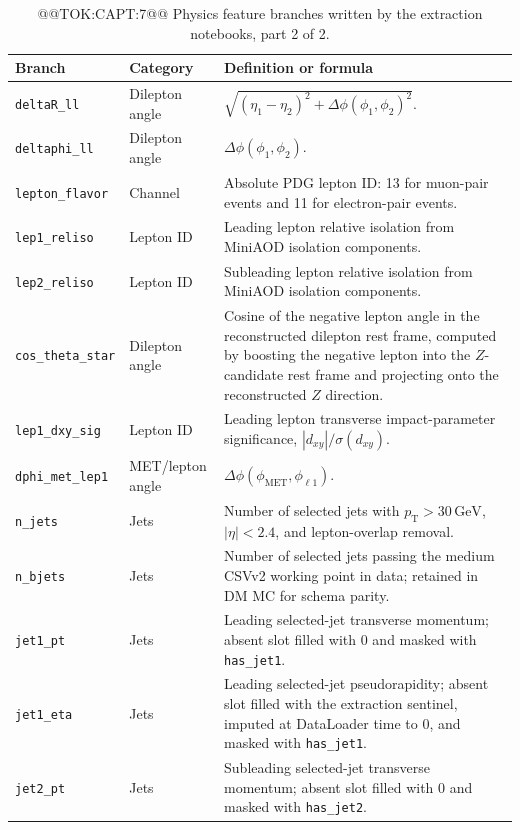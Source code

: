 \documentclass[11pt]{article}
\newcommand{\GeV}{\text{GeV}}
\begin{document}
\begin{table}[t]
\centering
\scriptsize
\caption{@@TOK:CAPT:7@@ Physics feature branches written by the extraction notebooks, part 2 of 2.}
\label{tab:appendix-features-cont}
\begin{tabular}{>{\raggedright\arraybackslash}p{}>{\raggedright\arraybackslash}p{}>{\raggedright\arraybackslash}p{}}
\toprule
Branch & Category & Definition or formula \\
\midrule
\texttt{deltaR\_ll} & Dilepton angle & \(\sqrt{(\eta_1-\eta_2)^2+\Delta\phi(\phi_1,\phi_2)^2}\). \\
\texttt{deltaphi\_ll} & Dilepton angle & \(\Delta\phi(\phi_1,\phi_2)\). \\
\texttt{lepton\_flavor} & Channel & Absolute PDG lepton ID: 13 for muon-pair events and 11 for electron-pair events. \\
\texttt{lep1\_reliso} & Lepton ID & Leading lepton relative isolation from MiniAOD isolation components. \\
\texttt{lep2\_reliso} & Lepton ID & Subleading lepton relative isolation from MiniAOD isolation components. \\
\texttt{cos\_theta\_star} & Dilepton angle & Cosine of the negative lepton angle in the reconstructed dilepton rest frame, computed by boosting the negative lepton into the \(Z\)-candidate rest frame and projecting onto the reconstructed \(Z\) direction. \\
\texttt{lep1\_dxy\_sig} & Lepton ID & Leading lepton transverse impact-parameter significance, \(|d_{xy}|/\sigma(d_{xy})\). \\
\texttt{dphi\_met\_lep1} & MET/lepton angle & \(\Delta\phi(\phi_{\mathrm{MET}},\phi_{\ell1})\). \\
\texttt{n\_jets} & Jets & Number of selected jets with \(p_{\mathrm{T}}>30\,\GeV\), \(|\eta|<2.4\), and lepton-overlap removal. \\
\texttt{n\_bjets} & Jets & Number of selected jets passing the medium CSVv2 working point in data; retained in DM MC for schema parity. \\
\texttt{jet1\_pt} & Jets & Leading selected-jet transverse momentum; absent slot filled with \(0\) and masked with \texttt{has\_jet1}. \\
\texttt{jet1\_eta} & Jets & Leading selected-jet pseudorapidity; absent slot filled with the extraction sentinel, imputed at DataLoader time to \(0\), and masked with \texttt{has\_jet1}. \\
\texttt{jet2\_pt} & Jets & Subleading selected-jet transverse momentum; absent slot filled with \(0\) and masked with \texttt{has\_jet2}. \\

\end{tabular}
\end{table}
\end{document}

